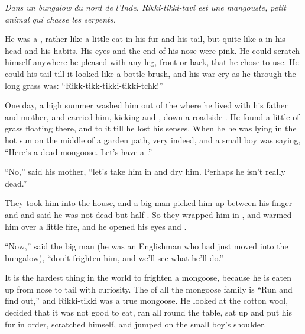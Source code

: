 \documentclass[troisieme]{fiche}
\begin{document}
\noindent\small\textit{Dans un bungalow du nord de l'Inde. Rikki-tikki-tavi est une mangouste,
petit animal qui chasse les serpents.}\normalsize

\begin{texte}
He was a , rather like a little cat in his fur and his
tail, but quite like a  in his head and his habits. His eyes
and the end of his  nose were pink. He could
scratch himself anywhere he pleased with any leg, front or back, that he chose to use. He
could  his tail till it looked like a bottle brush,
and his war cry as he  through the long grass was:
``Rikk-tikk-tikki-tikki-tchk!''

One day, a high summer  washed him out of the
 where he lived with his father and mother, and carried him,
kicking and , down a roadside
. He found a little  of
grass floating there, and  to it till he lost his
senses. When he  he was lying in the hot sun on the
middle of a garden path, very  indeed, and a small
boy was saying, ``Here's a dead mongoose. Let's have a .''

``No,'' said his mother, ``let's take him in and dry him. Perhaps he isn't really dead.''

They took him into the house, and a big man picked him up between his finger and
 and said he was not dead but half .
So they wrapped him in , and warmed him over
a little fire, and he opened his eyes and .

``Now,'' said the big man (he was an Englishman who had just moved into the bungalow),
``don't frighten him, and we'll see what he'll do.''

It is the hardest thing in the world to frighten a mongoose, because he is eaten up from nose
to tail with curiosity. The  of all the mongoose family is
``Run and find out,'' and Rikki-tikki was a true mongoose. He looked at the cotton wool,
decided that it was not good to eat, ran all round the table, sat up and put his fur in order,
scratched himself, and jumped on the small boy's shoulder.


\end{texte}
\end{document}
